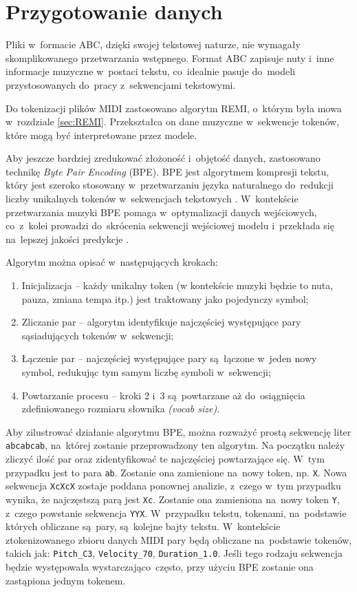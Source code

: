 \documentclass[data-science]{agh-wi} %
\begin{document}
\section{Przygotowanie danych}
Pliki w~formacie ABC, dzięki swojej tekstowej naturze, nie wymagały skomplikowanego przetwarzania wstępnego. Format ABC zapisuje nuty i~inne informacje muzyczne w~postaci tekstu, co~idealnie pasuje do~modeli przystosowanych do~pracy z~sekwencjami tekstowymi.

Do tokenizacji plików MIDI zastosowano algorytm REMI, o~którym była mowa w~rozdziale \ref*{sec:REMI}. Przekształca on dane muzyczne w~sekwencje tokenów, które mogą być interpretowane przez modele.

Aby jeszcze bardziej zredukować złożoność i~objętość danych, zastosowano technikę \textit{Byte Pair Encoding} (BPE). BPE jest algorytmem kompresji tekstu, który jest szeroko stosowany w~przetwarzaniu języka naturalnego do~redukcji liczby unikalnych tokenów w~sekwencjach tekstowych \cite{bpe}. W~kontekście przetwarzania muzyki BPE pomaga w~optymalizacji danych wejściowych, co~z~kolei prowadzi do~skrócenia sekwencji wejściowej modelu i~przekłada się na~lepszej jakości predykcje \cite*{fradet2023byte}.

\noindent Algorytm można opisać w~następujących krokach:

\begin{enumerate}
    \item Inicjalizacja -- każdy unikalny token (w kontekście muzyki będzie to nuta, pauza, zmiana tempa itp.) jest traktowany jako pojedynczy symbol;
    \item Zliczanie par -- algorytm identyfikuje najczęściej występujące pary sąsiadujących tokenów w~sekwencji;
    \item Łączenie par -- najczęściej występujące pary są~łączone w~jeden nowy symbol, redukując tym samym liczbę symboli w~sekwencji;
    \item Powtarzanie procesu -- kroki 2 i~3 są~powtarzane aż do~osiągnięcia zdefiniowanego rozmiaru słownika \textit{(vocab size)}.
\end{enumerate}

\noindent Aby zilustrować działanie algorytmu BPE, można rozważyć prostą sekwencję liter \texttt{abcabcab}, na~której zostanie przeprowadzony ten algorytm. Na początku należy zliczyć ilość par oraz zidentyfikować te najczęściej powtarzające się. W~tym przypadku jest to para \texttt{ab}. Zostanie ona zamienione na~nowy token, np. \texttt{X}. Nowa sekwencja \texttt{XcXcX} zostaje poddana ponownej analizie, z~czego w~tym przypadku wynika, że najczęstszą parą jest \texttt{Xc}. Zostanie ona zamieniona na~nowy token \texttt{Y}, z~czego powstanie sekwencja \texttt{YYX}. W~przypadku tekstu, tokenami, na~podstawie których obliczane są~pary, są~kolejne bajty tekstu. W~kontekście ztokenizowanego zbioru danych MIDI pary będą obliczane na~podstawie tokenów, takich jak: \texttt{Pitch\_C3}, \texttt{Velocity\_70}, \texttt{Duration\_1.0}. Jeśli tego rodzaju sekwencja będzie występowała wystarczająco~często, przy użyciu BPE zostanie ona zastąpiona jednym tokenem.
\end{document}
